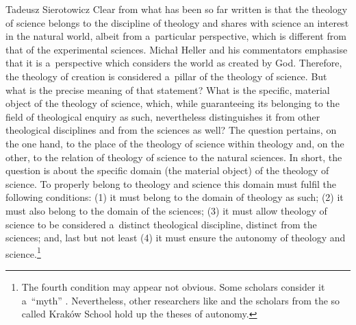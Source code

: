 \begin{artengenv}{Tadeusz Sierotowicz}
Clear from what has been so far written is that the theology of science belongs to the discipline of theology and shares with science an interest in the natural world, albeit from a~particular perspective, which is different from that of the experimental sciences. Michał Heller and his commentators emphasise that it is a~perspective which considers the world as created by God. Therefore, the theology of creation is considered a~pillar of the theology of science. But what is the precise meaning of that statement? What is the specific, material object of the theology of science, which, while guaranteeing its belonging to the field of theological enquiry as such, nevertheless distinguishes it from other theological disciplines and from the sciences as well? The question pertains, on the one hand, to the place of the theology of science within theology and, on the other, to the relation of theology of science to the natural sciences. In short, the question is about the specific domain (the material object) of the theology of science. To properly belong to theology and science this domain must fulfil the following conditions: (1) it must belong to the domain of theology as such; (2) it must also belong to the domain of the sciences; (3) it must allow theology of science to be considered a~distinct theological discipline, distinct from the sciences; and, last but not least (4) it must ensure the autonomy of theology and science.\footnote{The fourth condition may appear not obvious. Some scholars consider it a~``myth'' 
\parencite[as Paul Tyson in his book on theology of science:][chap.9.1.]{tyson_christian_2022}. %
 Nevertheless, other researchers like 
\parencite[][]{lococo_life_2021} %
 and the scholars from the so called Kraków School 
\parencites[][]{obolevitch_relationship_2015}[][]{polak_teologia_2015}[see also][]{macek_teologia_2014} %
 hold up the theses of autonomy.}




\end{artengenv}
